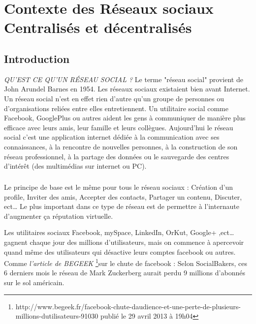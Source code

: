 \chapter{Contexte des Réseaux sociaux Centralisés et décentralisés\\}
\section{Introduction}
\textit{QU'EST CE QU'UN RÉSEAU SOCIAL ?}\newline
Le terme "réseau social" provient de John Arundel Barnes en 1954.
Les réseaux sociaux existaient bien avant Internet. Un réseau social n'est en effet rien d'autre qu'un groupe de personnes ou d'organisations reliées entre elles entretiennent.
Un utilitaire social comme Facebook, GooglePlus ou autres aident les gens à communiquer de manière plus efficace avec leurs amis, leur famille et leurs collègues. 
Aujourd'hui le réseau social c'est une application internet dédiée à la communication avec ses connaissances, à la rencontre de nouvelles personnes, à la construction de son réseau professionnel, à la partage des données ou le sauvegarde des centres d'intérêt (des multimédias sur internet ou PC).
\paragraph{}
Le principe de base est le même pour tous le réseau sociaux :
Création d'un profile, 
Inviter des amis,
Accepter des contacts, 
Partager un contenu,
Discuter, ect…
Le plus important dans ce type de réseau est de permettre à l'internaute d'augmenter ça réputation virtuelle.

Les utilitaires sociaux Facebook, mySpace, LinkedIn, OrKut, Google+ ,ect… gagnent chaque jour des millions d'utilisateurs, mais on commence à apercevoir quand même des utilisateurs qui désactive leurs comptes facebook ou autres. Comme \textit{l'article de BEGEEK} \footnote{http://www.begeek.fr/facebook-chute-daudience-et-une-perte-de-plusieurs-millions-dutilisateurs-91030 publié le 29 avril 2013 à 19h04}sur le chute de facebook :
Selon SocialBakers, ces 6 derniers mois le réseau de Mark Zuckerberg aurait perdu 9 millions d’abonnés sur le sol américain.
